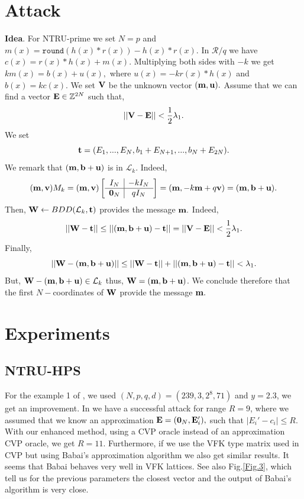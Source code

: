 \documentclass{amsart}
\numberwithin{equation}{section}
\begin{document}
\section{Attack}
{\bf Idea}. For NTRU-prime we set $N=p$ and $m(x)=\texttt{round}(h(x)*r(x)) - h(x)*r(x).$ In ${\mathcal{R}}/q$ we have $c(x)=r(x)*h(x)+m(x).$ Multiplying both sides with $-k$ we get 
$km(x)=b(x)+u(x),$
where $u(x)=-kr(x)*h(x)$ and $b(x)=kc(x).$
We set ${\bf V}$ be the unknown vector $({\bf m},{\bf u}).$ Assume that we can find a vector ${\bf E}\in {\mathbb{Z}}^{2N}$ such that,
$$||{\bf V}-{\bf E}||<\frac{1}{2}\lambda_1.$$
We set 
$${\bf t}=(E_1,...,E_N,b_1+E_{N+1},...,b_N+E_{2N}).$$
We remark that 
$({\bf m},{\bf b}+{\bf u})$ is in ${\mathcal{L}}_k.$ 
Indeed,
$$({\bf m},{\bf v})M_k=
({\bf m},{\bf v})\left[\begin{array}{c|c}
			I_N & -kI_N  \\
			\hline
			{\bf 0}_N & qI_N   \\
		\end{array}\right] = 	 ({\bf m},-k{\bf m}+q{\bf v})=({\bf m},{\bf b}+{\bf u}).$$
Then, ${\bf W}\leftarrow BDD({\mathcal{L}}_k,{\bf t})$  provides the message ${\bf m}.$ Indeed,
$$||{\bf W} - {\bf t}||\le ||({\bf m},{\bf b}+{\bf u})-{\bf t}||=||{\bf V}-{\bf E}||<\frac{1}{2}\lambda_1.$$
Finally, 
$$||{\bf W}-({\bf m},{\bf b}+{\bf u})||\le ||{\bf W}-{\bf t}|| +  ||({\bf m},{\bf b}+{\bf u}) - {\bf t}||<\lambda_1.$$
But, ${\bf W}-({\bf m},{\bf b}+{\bf u})\in {\mathcal{L}}_k$ thus, ${\bf W}=({\bf m},{\bf b}+{\bf u})$. We conclude therefore that the first $N-$coordinates of ${\bf W}$ provide the message ${\bf m}.$
\section{Experiments}
\subsection{NTRU-HPS}
For the example 1 of \cite{adam_draz}, we used $(N,p,q,d)=(239,3,2^{8},71)$ and $y=2.3$, we get an improvement. In \cite{adam_draz} we have a successful attack for range $R=9$, where we assumed that we know an approximation 
${\bf E}=({\bf 0}_N,{\bf E}_i'),$ such that $|E_i'-c_i|\leq R.$ With our enhanced method, using a CVP oracle instead of an approximation CVP oracle, we get $R=11.$ Furthermore, if we use the VFK type matrix used in CVP but using Babai's approximation algorithm we also get similar results. It seems that Babai behaves very well in VFK lattices. See also Fig.\ref{Fig.3}, which tell us for the previous parameters the closest vector and the output of Babai's algorithm is very close.
\end{document}
